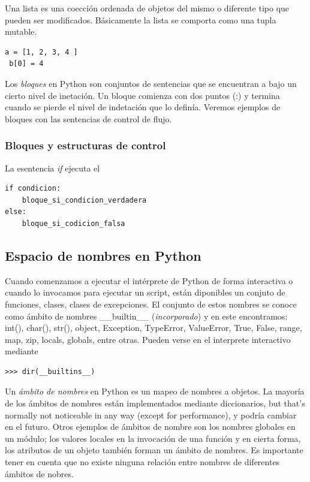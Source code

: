 \documentclass[a4paper]{report}
\begin{document}
Una lista es una coección ordenada de objetos del mismo o diferente tipo que pueden 
ser modificados. Básicamente la lista se comporta como una tupla mutable.
\begin{lstlisting}[style=python]
 a = [1, 2, 3, 4 ]
 b[0] = 4
\end{lstlisting}

Los \emph{bloques} en Python son conjuntos de sentencias que se encuentran a 
bajo un cierto nivel de inetación. Un bloque comienza con dos puntos (:)
y termina cuando se pierde el nivel de indetación que lo definía. Veremos
ejemplos de bloques con las sentencias de control de flujo.

\subsubsection*{Bloques y estructuras de control}
La esentencia \emph{if} ejecuta el 
\begin{lstlisting}[style=python]
if condicion:
    bloque_si_condicion_verdadera
else:
    bloque_si_codicion_falsa
\end{lstlisting}

\subsection{Espacio de nombres en Python}
Cuando comenzamos a ejecutar el intérprete de Python de forma interactiva o cuando
lo invocamos para ejecutar un script, están diponibles un conjuto de funciones, clases,
clases de excepciones. El conjunto de estos nombres se conoce como ámbito de nombres 
\_\_builtin\_\_ (\emph{incorporado}) y en este encontramos: int(), char(), str(), object, 
Exception, TypeError, ValueError, True, False, range, map, zip, locals, globals, entre otras.
Pueden verse en el interprete interactivo mediante
\begin{verbatim}
>>> dir(__builtins__)
\end{verbatim}



Un \emph{ámbito de nombres} en Python es un mapeo de nombres a objetos. La mayoría de 
los ámbitos de nombres están implementados mediante diccionarios, but that's normally not noticeable in any
way (except for performance), y podría cambiar en el futuro. Otros ejemplos de ámbitos de nombre
son los nombres globales en un módulo; los valores locales en la invocación de una función y en cierta forma, 
los atributos de un objeto también forman un ámbito de nombres.
Es importante tener en cuenta que no existe ninguna relación entre nombres de diferentes ámbitos de nobres. 
\end{document}
